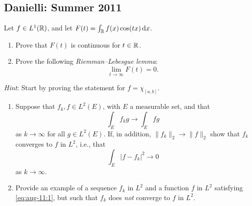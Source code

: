 \subsection{Danielli: Summer 2011}
\setcounter{exercise}{0}
\setcounter{equation}{0}

\begin{problem}
Let $f\in L^1(\mathbb{R})$, and let $F(t)=\int_{\mathbb{R}} f(x)\cos(tx)\mathop{}\!\mathrm{d} x$.
\begin{enumerate}[label=(\alph*),noitemsep]
\item Prove that $F(t)$ is continuous for $t\in\mathbb{R}$.
\item Prove the following \emph{Riemman--Lebesgue lemma}:
\[
\lim_{t\to\infty}F(t)=0.
\]
\end{enumerate}
\emph{Hint}: Start by proving the statement for $f=\chi_{[a,b]}$.
\end{problem}
\begin{solution}

\end{solution}

\begin{problem}
\begin{enumerate}[label=(\alph*),noitemsep]
\item Suppose that $f_k,f\in L^2(E)$, with $E$ a measurable set, and that
\begin{equation}
\label{eq:aug-11:1}
\int_E f_kg\longrightarrow\int_E fg
\end{equation}
as $k\to\infty$ for all $g\in L^2(E)$. If, in addition,
$\|f_k\|_2\to\|f\|_2$ show that $f_k$ converges to $f$ in $L^2$, i.e., that
\[
\int_E|f-f_k|^2\longrightarrow 0
\]
as $k\to\infty$.
\item Provide an example of a sequence $f_k$ in $L^2$ and a function $f$ in
  $L^2$ satisfying \eqref{eq:aug-11:1}, but such that $f_k$ does \emph{not}
  converge to $f$ in $L^2$.
\end{enumerate}
\end{problem}
\begin{solution}
\end{solution}

